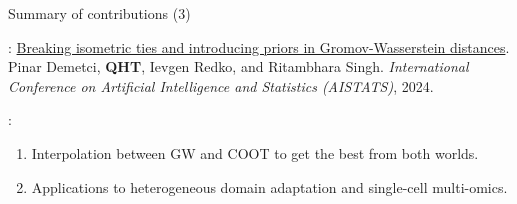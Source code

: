 \documentclass{beamer}
\begin{document}
\begin{frame}{Summary of contributions (3)}
  \scriptsize

  \vspace{-3cm}
  {}: \ul{Breaking isometric ties and introducing priors in Gromov-Wasserstein distances}.
  Pinar Demetci, \textbf{QHT}, Ievgen Redko, and Ritambhara Singh.
  \textit{International Conference on Artificial Intelligence and Statistics (AISTATS)}, 2024.

  \vspace{0.3cm}
  {}:
  \begin{enumerate}
    \item Interpolation between GW and COOT to get the best from both worlds.
    \item Applications to heterogeneous domain adaptation and single-cell multi-omics.
  \end{enumerate}

\end{frame}
\end{document}
